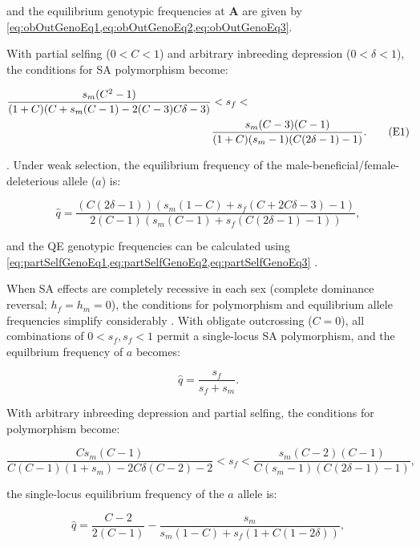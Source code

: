 \documentclass{article}
\newcommand\numberthis{\addtocounter{equation}{1}\tag{\theequation}}
\begin{document}
\noindent and the equilibrium genotypic frequencies at $\mathbf{A}$ are given by \cref{eq:obOutGenoEq1,eq:obOutGenoEq2,eq:obOutGenoEq3}. 

With partial selfing ($0 < C < 1$) and arbitrary inbreeding depression ($0 < \delta < 1$), the conditions for SA polymorphism become:

\begin{align*} 
    \frac{s_m(C^2 - 1)}{(1 + C) (C + s_m(C - 1) - 2(C - 3)C \delta - 3)}& < s_f < \\
    &\frac{s_m(C - 3)(C - 1)}{(1 + C) (s_m - 1) (C(2 \delta - 1) - 1)}. \numberthis
\end{align*}

\noindent \citep{JordanConnallon2014}. Under weak selection, the equilibrium frequency of the male-beneficial/female-deleterious allele ($a$) is:

\begin{equation} 
    \hat{q} = \frac{(C(2 \delta - 1))(s_m(1 - C) + s_f(C+2 C \delta - 3) - 1)}{2(C - 1)(s_m(C - 1)+s_f(C(2 \delta - 1) - 1))},
\end{equation}

\noindent and the QE genotypic frequencies can be calculated using \cref{eq:partSelfGenoEq1,eq:partSelfGenoEq2,eq:partSelfGenoEq3} \citep{JordanConnallon2014}.

When SA effects are completely recessive in each sex (complete dominance reversal; $h_f = h_m = 0$), the conditions for polymorphism and equilibrium allele frequencies simplify considerably \citep{ConnallonJordan2016}. With obligate outcrossing ($C = 0$), all combinations of $0 < s_f,s_f < 1$ permit a single-locus SA polymorphism, and the equilbrium frequency of $a$ becomes:

\begin{equation} 
    \hat{q} = \frac{s_f}{s_f + s_m}.
\end{equation}

\noindent With arbitrary inbreeding depression and partial selfing, the conditions for polymorphism become:

\begin{equation} 
    \frac{C s_m(C - 1)}{C(C - 1)(1 + s_m) - 2 C \delta(C - 2) - 2} < s_f < \frac{s_m(C - 2)(C - 1)}{C(s_m - 1)(C(2 \delta - 1) - 1)},
\end{equation}

\noindent the single-locus equilibrium frequency of the $a$ allele is:

\begin{equation} 
    \hat{q} = \frac{C - 2}{2(C - 1)} - \frac{s_m}{s_m(1 - C) + s_f(1 + C(1 - 2 \delta))},
\end{equation}
\end{document}
